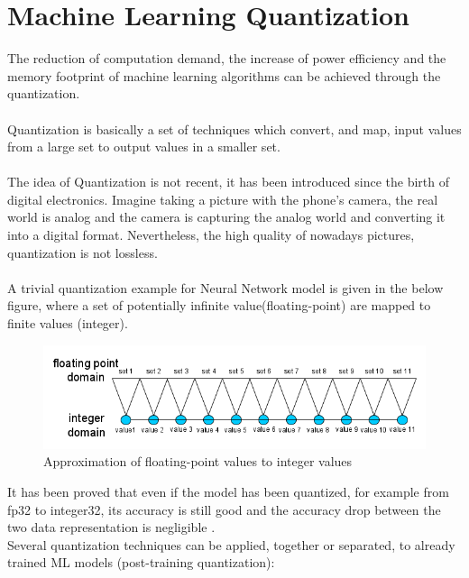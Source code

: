 \section{Machine Learning Quantization}
The reduction of computation demand, the increase of power efficiency and the memory footprint of machine learning algorithms can be achieved through the quantization.\\\\

Quantization is basically a set of techniques which convert, and map, input values from a large set to output values in a smaller set.\\\\The idea of Quantization is not recent, it has been introduced since the birth of digital electronics. Imagine taking a picture with the phone's camera, the real world is analog and the camera is capturing the analog world and converting it into a digital format. Nevertheless, the high quality of nowadays pictures, quantization is not lossless.\\\\
A trivial quantization example for Neural Network model is given in the below figure, where a set of potentially infinite value(floating-point) are mapped to finite values (integer).
\begin{figure}[H]
\centering
\captionsetup{justification=centering}
\includegraphics[scale=0.55]{./figure/quant.png}
\caption{Approximation of floating-point values to integer values}
\label{fig:quant}
\end{figure}
It has been proved that even if the model has been quantized, for example from fp32 to integer32, its accuracy is still good and the accuracy drop between the two data representation is negligible \cite{paper:8}.\\
Several quantization techniques can be applied, together or separated, to already trained ML models (post-training quantization):
